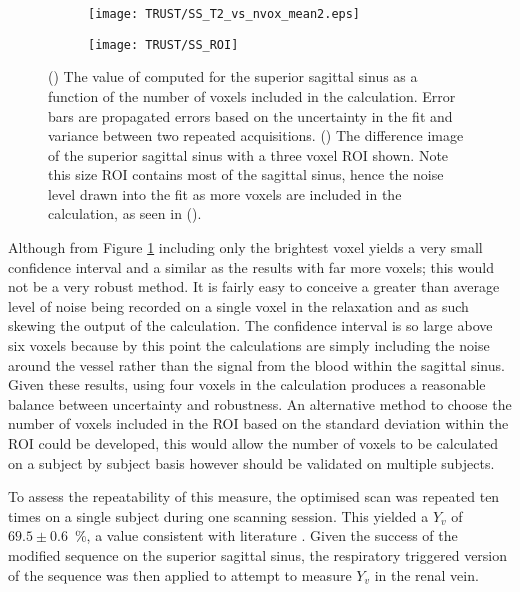 \begin{figure}[H]
	\centering
	\begin{subfigure}[c]{0.47\textwidth}
		\centering
		\texttt{[image: TRUST/SS\_T2\_vs\_nvox\_mean2.eps]}
		\caption{}
		\label{fig:nvox_SS}
	\end{subfigure}
	\hfill
	\begin{subfigure}[c]{0.47\textwidth}
		\centering
		\texttt{[image: TRUST/SS\_ROI]}
		\caption{}
		\label{fig:SS_ROI}
	\end{subfigure}
	\caption{() The value of \ttwo computed for the superior sagittal sinus as a function of the number of voxels included in the calculation. Error bars are propagated errors based on the uncertainty in the \ttwo fit and variance between two repeated acquisitions. () The difference image of the superior sagittal sinus with a three voxel \ac{ROI} shown. Note this size \ac{ROI} contains most of the sagittal sinus, hence the noise level drawn into the fit as more voxels are included in the calculation, as seen in ().}
	\label{fig:nv_SS}
\end{figure}

\newpage
Although from Figure \ref{fig:nvox_SS} including only the brightest voxel yields a very small confidence interval and a similar \ttwo as the results with far more voxels; this would not be a very robust method. It is fairly easy to conceive a greater than average level of noise being recorded on a single voxel in the relaxation and as such skewing the output of the calculation. The confidence interval is so large above six voxels because by this point the calculations are simply including the noise around the vessel rather than the signal from the blood within the sagittal sinus. Given these results, using four voxels in the calculation produces a reasonable balance between uncertainty and robustness. An alternative method to choose the number of voxels included in the \ac{ROI} based on the standard deviation within the \ac{ROI} could be developed, this would allow the number of voxels to be calculated on a subject by subject basis however should be validated on multiple subjects.

To assess the repeatability of this measure, the optimised scan was repeated ten times on a single subject during one scanning session. This yielded a $Y_v$ of $69.5\pm0.6$~\%, a value consistent with literature \cite{nagdyman_comparison_2005, liu_multi-site_2016}. Given the success of the modified sequence on the superior sagittal sinus, the respiratory triggered version of the sequence was then applied to attempt to measure $Y_v$ in the renal vein.

